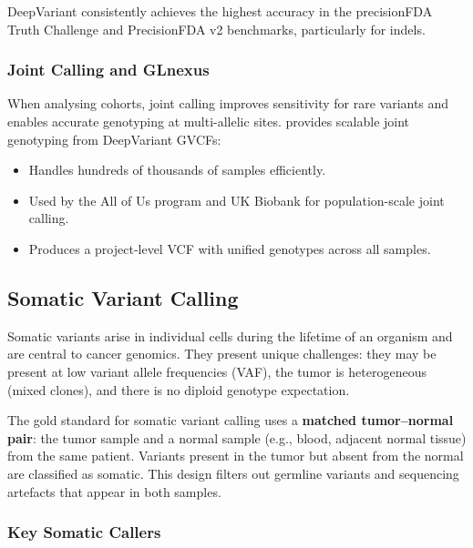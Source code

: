 DeepVariant consistently achieves the highest accuracy in the precisionFDA Truth Challenge and PrecisionFDA v2 benchmarks, particularly for indels.

\subsubsection{Joint Calling and GLnexus}

When analysing cohorts, joint calling improves sensitivity for rare variants and enables accurate genotyping at multi-allelic sites.  provides scalable joint genotyping from DeepVariant GVCFs:

\begin{itemize}[nosep]
  \item Handles hundreds of thousands of samples efficiently.
  \item Used by the All of Us program and UK Biobank for population-scale joint calling.
  \item Produces a project-level VCF with unified genotypes across all samples.
\end{itemize}

\subsection{Somatic Variant Calling}

Somatic variants arise in individual cells during the lifetime of an organism and are central to cancer genomics. They present unique challenges: they may be present at low variant allele frequencies (VAF), the tumor is heterogeneous (mixed clones), and there is no diploid genotype expectation.

\begin{keyconcept}[title={Tumor/Normal Paired Analysis}]
The gold standard for somatic variant calling uses a \textbf{matched tumor--normal pair}: the tumor sample and a normal sample (e.g., blood, adjacent normal tissue) from the same patient. Variants present in the tumor but absent from the normal are classified as somatic. This design filters out germline variants and sequencing artefacts that appear in both samples.
\end{keyconcept}

\subsubsection{Key Somatic Callers}

